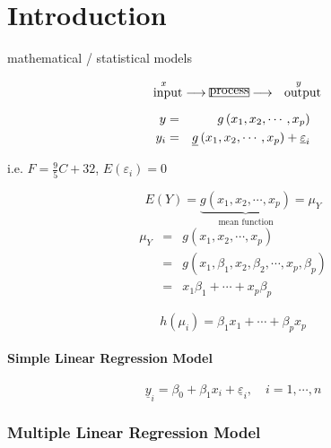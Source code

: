 \documentclass{article}
\begin{document}
\setcounter{part}{1} \setcounter{page}{1}

\section{Introduction}

mathematical / statistical models

\begin{equation*}
\overset{x}{\text{input}}\longrightarrow \frame{process}\longrightarrow 
\overset{y}{\text{output}}
\end{equation*}

\begin{eqnarray*}
y &=&g\left( x_{1},x_{2},\cdots ,x_{p}\right) \\
y_{i} &=&\underline{g}\left( x_{1},x_{2},\cdots ,x_{p}\right) +\underline{%
\varepsilon }_{i}
\end{eqnarray*}

i.e. $F=\frac{9}{5}C+32$, $E\left( \varepsilon _{i}\right) =0$

\bigskip

\begin{equation*}
E\left( Y\right) =\underset{\text{mean function}}{\underbrace{g\left(
x_{1},x_{2},\cdots ,x_{p}\right) }}=\mu _{Y}
\end{equation*}%
\begin{eqnarray*}
\mu _{Y} &=&g\left( x_{1},x_{2},\cdots ,x_{p}\right) \\
&=&g\left( x_{1},\beta _{1},x_{2},\beta _{2},\cdots ,x_{p},\beta _{p}\right)
\\
&=&x_{1}\beta _{1}+\cdots +x_{p}\beta _{p}
\end{eqnarray*}

\begin{equation*}
h\left( \mu _{i}\right) =\beta _{1}x_{1}+\cdots +\beta _{p}x_{p}
\end{equation*}

\bigskip

\paragraph{Simple Linear Regression Model}

\begin{equation*}
\underline{y}_{i}=\beta _{0}+\beta _{1}x_{i}+\underline{\varepsilon }%
_{i},\quad i=1,\cdots ,n
\end{equation*}

\subsubsection{Multiple Linear Regression Model}
\end{document}

